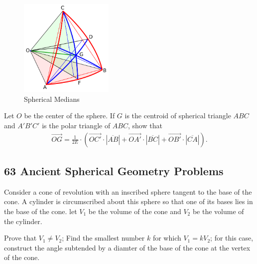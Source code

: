 \documentclass[12pt,a4paper]{memoir}
\theoremstyle{definition}
\begin{document}
\begin{figure}[H]
	\centering
	\includegraphics[width=0.4\textwidth]{IMG/Medians.png}
	\caption{Spherical Medians }
	\label{fig:medians}
\end{figure}	

		\begin{question}
			Let $O$ be the center of the sphere. If $G$ is the centroid of spherical triangle $ABC$ and $A'B'C'$ is the polar triangle of $ABC$, show that
			\begin{align*}
				{\overrightarrow {OG}}={\frac {1}{2E}}\cdot \left({\overrightarrow {OC'}}\cdot |{\overline {AB}}|+{\overrightarrow { OA'}}\cdot |{\overline {BC}}|+{\overrightarrow {OB'}}\cdot |{\overline {CA}}|\right).
			\end{align*}
		\end{question}




\newpage
\subsection{63 Ancient Spherical Geometry Problems}

\begin{question}[name={1960 International Mathematical Olympiad}]
	Consider a cone of revolution with an inscribed sphere tangent to the base of the cone. A cylinder is circumscribed about this sphere so that one of its bases lies in the base of the cone. let $V_1$ be the volume of the cone and $V_2$ be the volume of the cylinder.
	\begin{tasks}
		\task Prove that $V_1 \neq V_2$;
		\task  Find the smallest number $k$ for which $V_1=kV_2$; for this case, construct the angle subtended by a diamter of the base of the cone at the vertex of the cone.
	\end{tasks}
\end{question}
\end{document}

